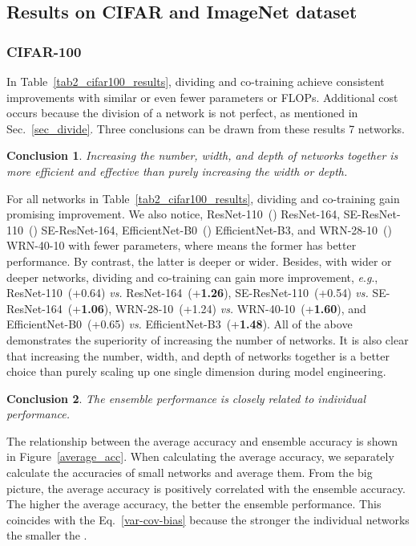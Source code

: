 \documentclass[lettersize,journal]{IEEEtran}
\newcommand{\eg}{\textit{e}.\textit{g}.}
\newtheorem{conclusion}{Conclusion}
\begin{document}
\subsection{Results on CIFAR and ImageNet dataset}
\subsubsection{CIFAR-100} \label{sec_cifar_100}
In Table~\ref{tab2_cifar100_results},
dividing and co-training achieve consistent improvements
with similar or even fewer parameters or FLOPs.
Additional cost occurs because the division of a
network is not perfect, as mentioned in Sec.~\ref{sec_divide}.
Three conclusions can be drawn from these results 7 networks.
\begin{conclusion} \label{conclu_number}
\textit{Increasing the number, width, and depth of networks together
is more efficient and effective than purely increasing the width or depth.}
\end{conclusion}

For all networks in Table~\ref{tab2_cifar100_results},
dividing and co-training gain promising improvement.
We also notice,
ResNet-110~()  ResNet-164,
SE-ResNet-110~()  SE-ResNet-164,
EfficientNet-B0~()  EfficientNet-B3,
and WRN-28-10~()  WRN-40-10
with fewer parameters,
where  means the former has better performance.
By contrast, the latter is deeper or wider.
Besides, with wider or deeper networks,
dividing and co-training can gain more improvement,
\eg, ResNet-110~(+0.64) \textit{vs.} ResNet-164~(+\textbf{1.26}), 
SE-ResNet-110~(+0.54) \textit{vs.} SE-ResNet-164~(+\textbf{1.06}),
WRN-28-10~(+1.24) \textit{vs.} WRN-40-10~(+\textbf{1.60}), and
EfficientNet-B0~(+0.65) \textit{vs.} EfficientNet-B3~(+\textbf{1.48}).
All of the above demonstrates the superiority of increasing the number of networks.
It is also clear that increasing the number, width, and depth of networks together
is a better choice than purely scaling up one single dimension during model engineering.


\begin{conclusion} \label{conclu_perform}
\textit{The ensemble performance is closely related to individual performance.}
\end{conclusion}

The relationship between the average accuracy and
ensemble accuracy is shown in Figure~\ref{average_acc}.
When calculating the average accuracy,
we separately calculate the accuracies of small networks and average them.
From the big picture, the average accuracy is positively correlated with
the ensemble accuracy.
The higher the average accuracy, the better the ensemble performance.
This coincides with the Eq.~\eqref{var-cov-bias} because the stronger the
individual networks the smaller the .
\end{document}

